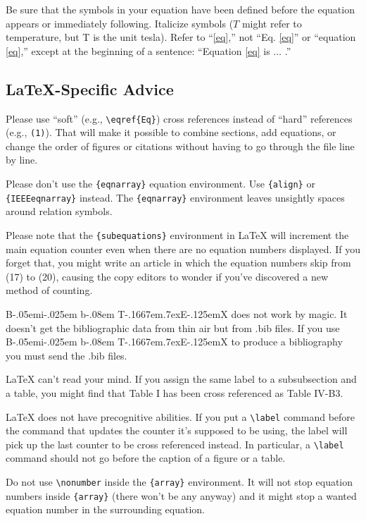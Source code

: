 \documentclass{ieeeaccess}
\def\BibTeX{{\rm B\kern-.05em{\sc i\kern-.025em b}\kern-.08em
    T\kern-.1667em\lower.7ex\hbox{E}\kern-.125emX}}
\begin{document}
Be sure that the symbols in your equation have been defined before the
equation appears or immediately following. Italicize symbols ($T$ might refer
to temperature, but T is the unit tesla). Refer to ``\eqref{eq},'' not ``Eq. \eqref{eq}''
or ``equation \eqref{eq},'' except at the beginning of a sentence: ``Equation \eqref{eq}
is $\ldots$ .''

\subsection{\LaTeX-Specific Advice}

Please use ``soft'' (e.g., \verb|\eqref{Eq}|) cross references instead
of ``hard'' references (e.g., \verb|(1)|). That will make it possible
to combine sections, add equations, or change the order of figures or
citations without having to go through the file line by line.

Please don't use the \verb|{eqnarray}| equation environment. Use
\verb|{align}| or \verb|{IEEEeqnarray}| instead. The \verb|{eqnarray}|
environment leaves unsightly spaces around relation symbols.

Please note that the \verb|{subequations}| environment in {\LaTeX}
will increment the main equation counter even when there are no
equation numbers displayed. If you forget that, you might write an
article in which the equation numbers skip from (17) to (20), causing
the copy editors to wonder if you've discovered a new method of
counting.

{\BibTeX} does not work by magic. It doesn't get the bibliographic
data from thin air but from .bib files. If you use {\BibTeX} to produce a
bibliography you must send the .bib files.

{\LaTeX} can't read your mind. If you assign the same label to a
subsubsection and a table, you might find that Table I has been cross
referenced as Table IV-B3.

{\LaTeX} does not have precognitive abilities. If you put a
\verb|\label| command before the command that updates the counter it's
supposed to be using, the label will pick up the last counter to be
cross referenced instead. In particular, a \verb|\label| command
should not go before the caption of a figure or a table.

Do not use \verb|\nonumber| inside the \verb|{array}| environment. It
will not stop equation numbers inside \verb|{array}| (there won't be
any anyway) and it might stop a wanted equation number in the
surrounding equation.
\end{document}
